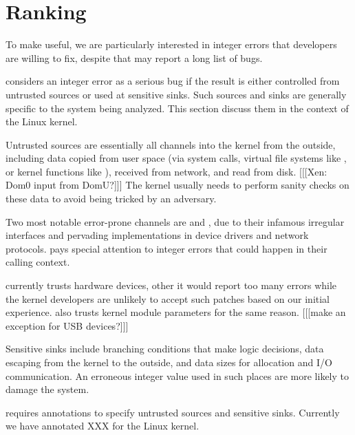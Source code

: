 \section{Ranking}

To make \sys useful, we are particularly interested in integer
errors that developers are willing to fix, despite that \sys may
report a long list of bugs.

\sys considers an integer error as a serious bug if the result is
either controlled from untrusted sources or used at sensitive sinks.
Such sources and sinks are generally specific to the system being
analyzed.  This section discuss them in the context of the Linux
kernel.

Untrusted sources are essentially all channels into the kernel from
the outside, including data copied from user space (via system
calls, virtual file systems like , or kernel functions
like ), received from network, and read from
disk. [[[Xen: Dom0 input from DomU?]]]
The kernel usually needs to perform sanity checks on these data to
avoid being tricked by an adversary.

Two most notable error-prone channels are  and ,
due to their infamous irregular interfaces and pervading implementations
in device drivers and network protocols.  \sys pays special attention
to integer errors that could happen in their calling context.

\sys currently trusts hardware devices, other it would report too
many errors while the kernel developers are unlikely to accept such
patches based on our initial experience.  \sys also trusts kernel
module parameters for the same reason.
[[[make an exception for USB devices?]]]

Sensitive sinks include branching conditions that make logic
decisions, data escaping from the kernel to the outside, and data
sizes for allocation and I/O communication.  An erroneous integer
value used in such places are more likely to damage the system.

\sys requires annotations to specify untrusted sources and sensitive
sinks.  Currently we have annotated XXX for the Linux kernel.

